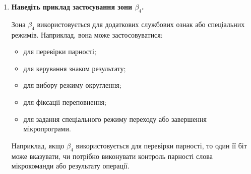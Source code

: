 \documentclass[12pt,a4paper]{article}
\begin{document}
\begin{enumerate}
        \item \textbf{Наведіть приклад застосування зони $\beta_4$.}

        Зона $\beta_4$ використовується для додаткових службових ознак або спеціальних режимів. Наприклад, вона може застосовуватися:
        \begin{itemize}
            \item для перевірки парності;
            \item для керування знаком результату;
            \item для вибору режиму округлення;
            \item для фіксації переповнення;
            \item для задання спеціального режиму переходу або завершення мікропрограми.
        \end{itemize}

        Наприклад, якщо $\beta_4$ використовується для перевірки парності, то один її біт може вказувати, чи потрібно виконувати контроль парності слова мікрокоманди або результату операції.
    \end{enumerate}
\end{document}

